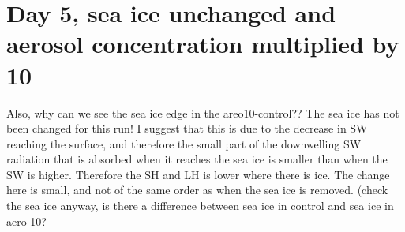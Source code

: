 \section{Day 5, sea ice unchanged and aerosol concentration multiplied by 10}
Also, why can we see the sea ice edge in the areo10-control?? The sea ice has not been changed for this run! I suggest that this is due to the decrease in SW reaching the surface, and therefore the small part of the downwelling SW radiation that is absorbed when it reaches the sea ice is smaller than when the SW is higher. Therefore the SH and LH is lower where there is ice. The change here is small, and not of the same order as when the sea ice is removed. (check the sea ice anyway, is there a difference between sea ice in control and sea ice in aero 10?






